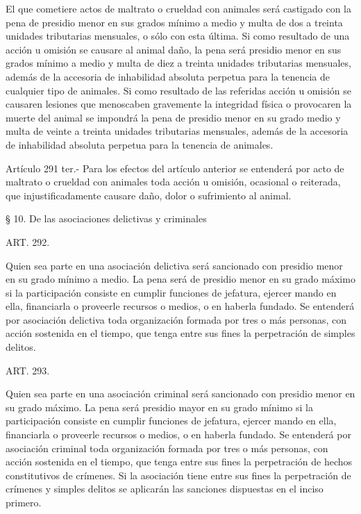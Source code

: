     El que cometiere actos de maltrato o crueldad con animales será castigado con la pena de presidio menor en sus grados mínimo a medio y multa de dos a treinta unidades tributarias mensuales, o sólo con esta última.
    Si como resultado de una acción u omisión se causare al animal daño, la pena será presidio menor en sus grados mínimo a medio y multa de diez a treinta unidades tributarias mensuales, además de la accesoria de inhabilidad absoluta perpetua para la tenencia de cualquier tipo de animales.
    Si como resultado de las referidas acción u omisión se causaren lesiones que menoscaben gravemente la integridad física o provocaren la muerte del animal se impondrá la pena de presidio menor en su grado medio y multa de veinte a treinta unidades tributarias mensuales, además de la accesoria de inhabilidad absoluta perpetua para la tenencia de animales.



    Artículo 291 ter.- Para los efectos del artículo anterior se entenderá por acto de maltrato o crueldad con animales toda acción u omisión, ocasional o reiterada, que injustificadamente causare daño, dolor o sufrimiento al animal.


    § 10. De las asociaciones delictivas y criminales



    ART. 292.

    Quien sea parte en una asociación delictiva será sancionado con presidio menor en su grado mínimo a medio.
    La pena será de presidio menor en su grado máximo si la participación consiste en cumplir funciones de jefatura, ejercer mando en ella, financiarla o proveerle recursos o medios, o en haberla fundado.
    Se entenderá por asociación delictiva toda organización formada por tres o más personas, con acción sostenida en el tiempo, que tenga entre sus fines la perpetración de simples delitos.


    ART. 293.

    Quien sea parte en una asociación criminal será sancionado con presidio menor en su grado máximo.
    La pena será presidio mayor en su grado mínimo si la participación consiste en cumplir funciones de jefatura, ejercer mando en ella, financiarla o proveerle recursos o medios, o en haberla fundado.
    Se entenderá por asociación criminal toda organización formada por tres o más personas, con acción sostenida en el tiempo, que tenga entre sus fines la perpetración de hechos constitutivos de crímenes.
    Si la asociación tiene entre sus fines la perpetración de crímenes y simples delitos se aplicarán las sanciones dispuestas en el inciso primero.


